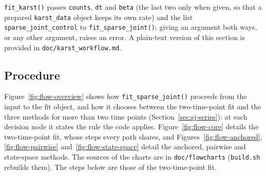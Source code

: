 \documentclass[11pt]{article}
\begin{document}
\texttt{fit\_karst()} passes \texttt{counts}, \texttt{dt} and \texttt{beta}
(the last two only when given, so that a prepared \texttt{karst\_data} object
keeps its own rate) and the list \texttt{sparse\_joint\_control} to
\texttt{fit\_sparse\_joint()}; giving an argument both ways, or any other
argument, raises an error. A plain-text version of this section is
provided in \texttt{doc/karst\_workflow.md}.

\subsection{Procedure}
\label{sec:procedure}

Figure~\ref{fig:flow-overview} shows how \texttt{fit\_sparse\_joint()}
proceeds from the input to the fit object, and how it chooses between the
two-time-point fit and the three methods for more than two time points
(Section~\ref{sec:sj-series}): at each decision node it states the rule the
code applies. Figure~\ref{fig:flow-core} details the two-time-point fit, whose
steps every path shares, and Figures~\ref{fig:flow-anchored},
\ref{fig:flow-pairwise} and~\ref{fig:flow-state-space} detail the anchored,
pairwise and state-space methods. The sources of the charts are in
\texttt{doc/flowcharts} (\texttt{build.sh} rebuilds them). The steps below are
those of the two-time-point fit.
\end{document}
